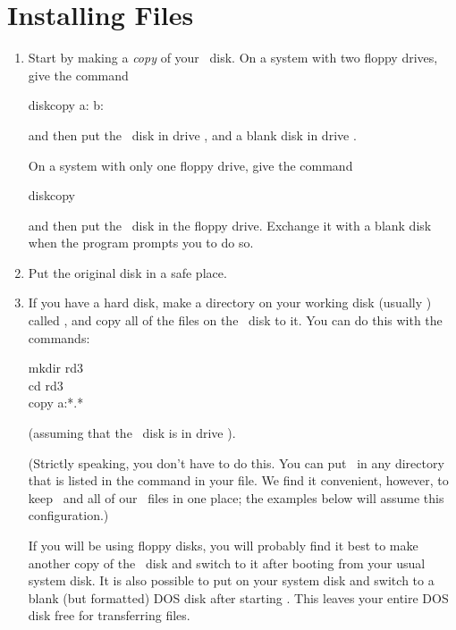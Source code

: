 
\section{Installing Files}

\begin{enumerate} 

\item
Start by making a {\em copy} of your \RD\ disk.
On a system with two floppy drives, give the command
\begin{dcode}
diskcopy a: b:
\end{dcode}
\noindent
and then put the \RD\ disk in drive , and a blank disk in
drive .
 
On a system with only one floppy drive, give the command
\begin{dcode}
diskcopy
\end{dcode}
\noindent
and then put the \RD\ disk in the floppy drive.  Exchange it with a
blank disk when the  program prompts you to do so.

\item 
Put the original disk in a safe place.

\item 
If you have a hard disk, make a directory on your working disk
(usually ) called , and copy all of the files on
the \RD\ disk to it.  You can do this with the commands:
\begin{dcode}
mkdir rd3\\
cd rd3\\
copy a:*.*
\end{dcode}
\noindent (assuming that the \RD\ disk is in drive ).
 
(Strictly speaking, you don't have to do this.  You can put \RD\
in any directory that is listed in the  command in your
\code{AUTOEXEC.BAT} file.  We find it convenient, however, to keep
\RD\ and all of our \OS\ files in one place; the examples below
will assume this configuration.)
 
If you will be using floppy disks, you will probably find it best to
make another copy of the \RD\ disk and switch to it after booting
from your usual system disk.  It is also possible to put
 on your system disk and switch to a blank (but
formatted) DOS disk after starting \RD.  This leaves your entire
DOS disk free for transferring files.

\end{enumerate}

